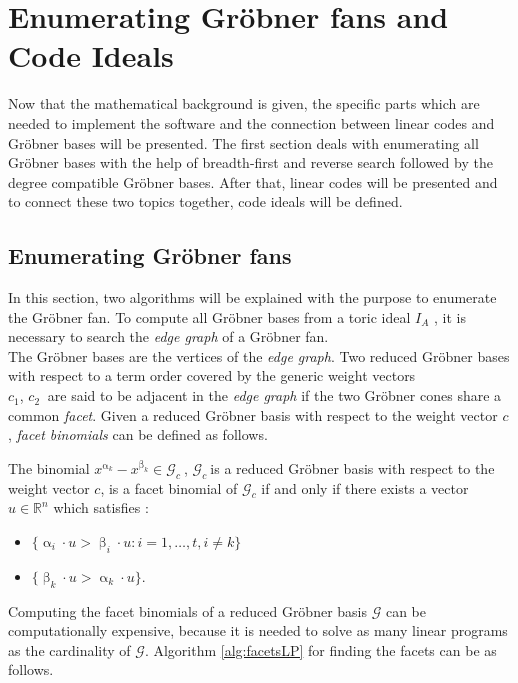 
\section{Enumerating Gröbner fans and Code Ideals}
\label{sec:enumerate}

Now that the mathematical background is given, the specific parts which are needed to implement the software and the connection between linear codes and Gröbner bases will be presented. The first section deals with enumerating all Gröbner bases with the help of breadth-first and reverse search followed by the degree compatible Gröbner bases.
After that, linear codes will be presented and to connect these two topics together, code ideals will be defined. 

\subsection{Enumerating Gröbner fans}
\label{subsec:enumerate}

In this section, two algorithms will be explained with the  purpose to enumerate the Gröbner fan.
To compute all Gröbner bases from a toric ideal $I_A$ , it is necessary to search the \textit{edge graph} of a Gröbner fan.\\
The Gröbner bases are the vertices of the \textit{edge graph}.
Two reduced Gröbner bases with respect to a term order covered by the generic weight vectors \\ $c_{1}$, $c_{2}~$ are said to be adjacent in the \textit{edge graph} if the two Gröbner cones share a common \textit{facet}. Given a reduced Gröbner basis with respect to the weight vector $c$, \textit{facet binomials} can be defined as follows.

\begin{env_definition}
\cite{tigers}
The binomial $x^{\upalpha_{k}}-x^{\upbeta_k} \in \mathcal{G}_c~$, $\mathcal{G}_c~$is a reduced Gröbner basis with respect to the weight vector $c$, is a facet binomial of $\mathcal{G}_c$ if and only if there exists a vector $u \in \mathbb{R}^{n}$ which satisfies :

\begin{itemize}
\item
$ \lbrace \upalpha_{i} \cdot u > \upbeta_{i} \cdot u : i = 1, \dots , t, i \neq k \rbrace  
$
\item
$ \lbrace \upbeta_{k} \cdot u > \upalpha_{k} \cdot u \rbrace .$
\end{itemize}


\end{env_definition}
Computing the facet binomials of a reduced Gröbner basis $\mathcal{G}$ can be computationally expensive, because it is needed to solve as many linear programs as the cardinality of $\mathcal{G}$. Algorithm \ref{alg:facetsLP} for finding the facets can be as follows.

